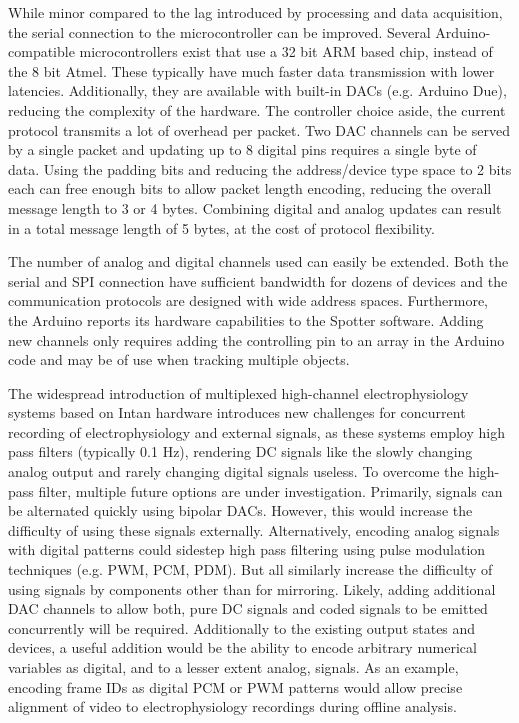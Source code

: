 While minor compared to the lag introduced by processing and data acquisition, the serial connection to the microcontroller can be improved. Several Arduino-compatible microcontrollers exist that use a 32 bit ARM based chip, instead of the 8 bit Atmel. These typically have much faster data transmission with lower latencies. Additionally, they are available with built-in DACs (e.g. Arduino Due), reducing the complexity of the hardware. The controller choice aside, the current protocol transmits a lot of overhead per packet. Two DAC channels can be served by a single packet and updating up to 8 digital pins requires a single byte of data. Using the padding bits and reducing the address/device type space to 2 bits each can free enough bits to allow packet length encoding, reducing the overall message length to 3 or 4 bytes. Combining digital and analog updates can result in a total message length of 5 bytes, at the cost of protocol flexibility.

The number of analog and digital channels used can easily be extended. Both the serial and SPI connection have sufficient bandwidth for dozens of devices and the communication protocols are designed with wide address spaces. Furthermore, the Arduino reports its hardware capabilities to the Spotter software. Adding new channels only requires adding the controlling pin to an array in the Arduino code and may be of use when tracking multiple objects.

The widespread introduction of multiplexed high-channel electrophysiology systems based on Intan hardware introduces new challenges for concurrent recording of electrophysiology and external signals, as these systems employ high pass filters (typically 0.1 Hz), rendering DC signals like the slowly changing analog output and rarely changing digital signals useless. To overcome the high-pass filter, multiple future options are under investigation. Primarily, signals can be alternated quickly using bipolar DACs. However, this would increase the difficulty of using these signals externally. Alternatively, encoding analog signals with digital patterns could sidestep high pass filtering using pulse modulation techniques (e.g. PWM, PCM, PDM). But all similarly increase the difficulty of using signals by components other than for mirroring. Likely, adding additional DAC channels to allow both, pure DC signals and coded signals to be emitted concurrently will be required. Additionally to the existing output states and devices, a useful addition would be the ability to encode arbitrary numerical variables as digital, and to a lesser extent analog, signals. As an example, encoding frame IDs as digital PCM or PWM patterns would allow precise alignment of video to electrophysiology recordings during offline analysis.

